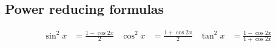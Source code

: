 \subsection*{Power reducing formulas}

\begin{align*}
  \sin^2 x  &= \frac{1 - \cos 2x}{2}
  &\cos^2 x  &= \frac{1 + \cos 2x}{2}
  &\tan^2 x  &= \frac{1 - \cos 2x}{1 + \cos 2x}
\end{align*}